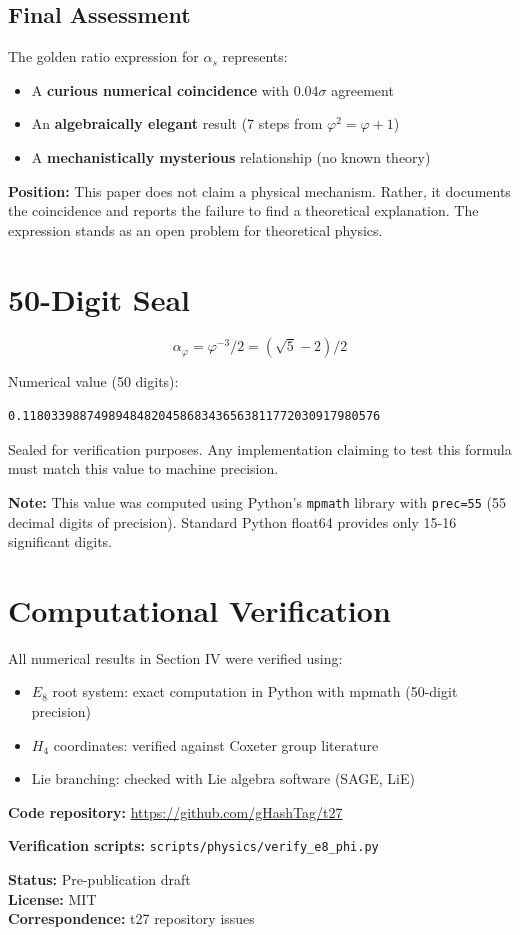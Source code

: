 \documentclass{article}
\begin{document}
\subsection{Final Assessment}

The golden ratio expression for $\alpha_s$ represents:
\begin{itemize}
\item A \textbf{curious numerical coincidence} with $0.04\sigma$ agreement
\item An \textbf{algebraically elegant} result (7 steps from $\varphi^2 = \varphi + 1$)
\item A \textbf{mechanistically mysterious} relationship (no known theory)
\end{itemize}

\textbf{Position:} This paper does not claim a physical mechanism. Rather, it documents the coincidence and reports the failure to find a theoretical explanation. The expression stands as an open problem for theoretical physics.

\appendix

\section{50-Digit Seal}

\[
\alpha_\varphi = \varphi^{-3}/2 = (\sqrt{5} - 2)/2
\]

Numerical value (50 digits):
\begin{verbatim}
0.11803398874989484820458683436563811772030917980576
\end{verbatim}

Sealed for verification purposes. Any implementation claiming to test this formula must match this value to machine precision.

\textbf{Note:} This value was computed using Python's \texttt{mpmath} library with \texttt{prec=55} (55 decimal digits of precision). Standard Python float64 provides only 15-16 significant digits.

\section{Computational Verification}

All numerical results in Section IV were verified using:
\begin{itemize}
\item $E_8$ root system: exact computation in Python with mpmath (50-digit precision)
\item $H_4$ coordinates: verified against Coxeter group literature
\item Lie branching: checked with Lie algebra software (SAGE, LiE)
\end{itemize}

\textbf{Code repository:} \url{https://github.com/gHashTag/t27}

\textbf{Verification scripts:} \texttt{scripts/physics/verify\_e8\_phi.py}

\medskip
\noindent
\textbf{Status:} Pre-publication draft \\
\textbf{License:} MIT \\
\textbf{Correspondence:} t27 repository issues



\end{document}
